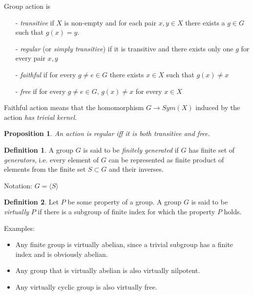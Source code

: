 \documentclass[a4paper,12pt]{amsart}
\newtheorem{proposition}[theorem]{Proposition}
\theoremstyle{definition}
\newtheorem{definition}{Definition}
\begin{document}
	Group action is
	
	\begin{itemize}
		\item[-] \textit{transitive} if $X$ is non-empty and for each pair $x,y \in X$ there exists a $g \in G$ such that $g(x) = y$.
		\item[-] \textit{regular} (or \textit{simply transitive}) if it is transitive and there exists only one $g$ for every pair $x, y$ 
		\item[-] \textit{faithful} if for every $g \neq e \in G$ there exists $x \in X$ such that $g(x) \neq x$
		\item[-] \textit{free} if for every $g \neq e \in G, \, g(x) \neq x$ for every $x \in X$ 
	\end{itemize}
	

	Faithful action means that the homomorphism $G \rightarrow Sym(X)$ induced by the action \textit{has trivial kernel}. 
	
	\begin{proposition}
		An action is regular iff it is both transitive and free. 
	\end{proposition}
	
	
	\begin{definition}
		A group $G$ is said to be \textit{finitely generated} if $G$ has finite set of \textit{generators}, i.e. every element of $G$ can be represented as finite product of elements from the finite set $S \subset G$ and their inverses. 
		
		Notation: $G = \langle S \rangle$ 
	\end{definition}
	
	
	
	
	\begin{definition}
		Let $P$ be some property of a group. A group $G$ is said to be \textit{virtually} $P$ if there is a subgroup of finite index for which the property $P$ holds. 
		
	\end{definition}
	
	Examples: 
	
	\begin{itemize}
		\item Any finite group is virtually abelian, since a trivial subgroup has a finite index and is obviously abelian. 
		
		\item Any group that is virtually abelian is also virtually nilpotent. 
		
		\item Any virtually cyclic group is also virtually free. 
		
	\end{itemize}
	
\end{document}
